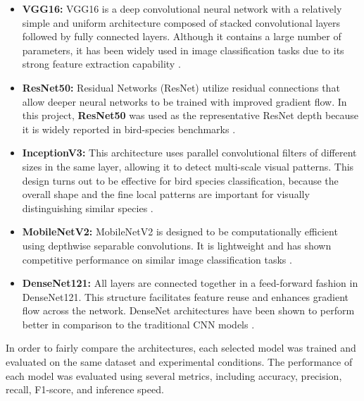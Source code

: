 \begin{itemize}

\item \textbf{VGG16:} VGG16 is a deep convolutional neural network with a relatively
simple and uniform architecture composed of stacked convolutional layers followed
by fully connected layers. Although it contains a large number of parameters, it
has been widely used in image classification tasks due to its strong feature
extraction capability \cite{bilgin2022bird,tang2025comparative}.

\item \textbf{ResNet50:} Residual Networks (ResNet) utilize residual connections that
allow deeper neural networks to be trained with improved gradient flow. In this
project, \textbf{ResNet50} was used as the representative ResNet depth because it is
widely reported in bird-species benchmarks \cite{bilgin2022bird,tang2025comparative}.

\item \textbf{InceptionV3:} This architecture uses parallel convolutional filters of different 
sizes in the same layer, allowing it to detect multi-scale visual patterns. 
This design turns out to be effective for bird species classification, 
because the overall shape and the fine local patterns are important for visually distinguishing similar species \cite{tang2025comparative}.

\item \textbf{MobileNetV2:} MobileNetV2 is designed to be computationally efficient using depthwise separable convolutions. 
It is lightweight and has shown competitive performance on similar image classification tasks \cite{lolge2025evolution,tang2025comparative}.

\item \textbf{DenseNet121:} All layers are connected together in a feed-forward fashion in DenseNet121.
This structure facilitates feature reuse and enhances gradient flow across the network.
DenseNet architectures have been shown to perform better in comparison to the traditional CNN models \cite{bilgin2022bird}.

\end{itemize}

In order to fairly compare the architectures, each selected model was trained and evaluated on the same dataset and experimental conditions.
The performance of each model was evaluated using several metrics, including accuracy, precision, recall, F1-score, and inference speed.

